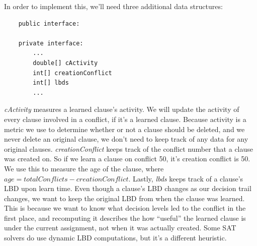 \documentclass[oneside]{book}
\begin{document}
In order to implement this, we'll need three additional data structures:
\begin{lstlisting}
    public interface:

    private interface:
        ...
        double[] cActivity
        int[] creationConflict
        int[] lbds
        ...
\end{lstlisting}
\noindent
\textit{cActivity} measures a learned clause's activity. We will update the activity of 
every clause involved in a conflict, if it's a learned clause. Because activity is a metric 
we use to determine whether or not a clause should be deleted, and we never delete an original 
clause, we don't need to keep track of any data for any original clauses. 
\textit{creationConflict} keeps track of the conflict number that a clause was created on.
So if we learn a clause on conflict 50, it's creation conflict is 50. We use this to measure the 
age of the clause, where $age = totalConflicts - creationConflict$.
Lastly, \textit{lbds} keeps track of a clause's LBD upon learn time. Even though a clause's LBD 
changes as our decision trail changes, we want to keep the original LBD from when the clause was 
learned. This is because we want to know what decision levels led to the conflict in the first place, 
and recomputing it describes the how ``useful'' the learned clause is under the current assignment, 
not when it was actually created. Some SAT solvers do use dynamic LBD computations, but it's a 
different heuristic.
\end{document}

